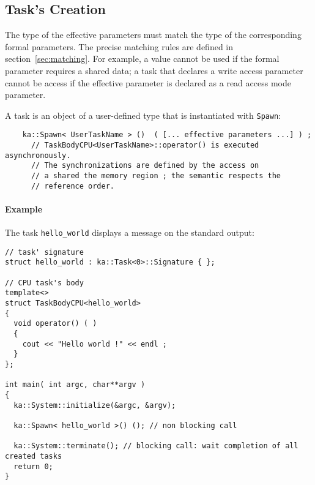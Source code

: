\subsection{Task's Creation}
The type of  the effective parameters must match the type of the 
corresponding formal parameters. The precise matching rules are defined in section~\ref{sec:matching}.
For example, a value cannot be used if the formal parameter requires a shared data;
a task that declares a write access parameter cannot be access if the effective parameter is declared as a read access mode parameter.

A task is an object of a user-defined type that is instantiated with \verb+Spawn+:
\begin{center}
\begin{boxit}
\begin{verbatim}
    ka::Spawn< UserTaskName > ()  ( [... effective parameters ...] ) ;
      // TaskBodyCPU<UserTaskName>::operator() is executed asynchronously.
      // The synchronizations are defined by the access on
      // a shared the memory region ; the semantic respects the
      // reference order.
\end{verbatim}
\end{boxit}
\end{center}

\paragraph{Example} The task {\tt hello\_world} displays a message on the
standard output:
\begin{center}
\begin{boxit}
\begin{verbatim}
// task' signature
struct hello_world : ka::Task<0>::Signature { };
  
// CPU task's body
template<>
struct TaskBodyCPU<hello_world> 
{
  void operator() ( ) 
  {
    cout << "Hello world !" << endl ;
  }
};  

int main( int argc, char**argv ) 
{
  ka::System::initialize(&argc, &argv);
  
  ka::Spawn< hello_world >() (); // non blocking call

  ka::System::terminate(); // blocking call: wait completion of all created tasks
  return 0;
}
\end{verbatim}
\end{boxit}
\end{center}


